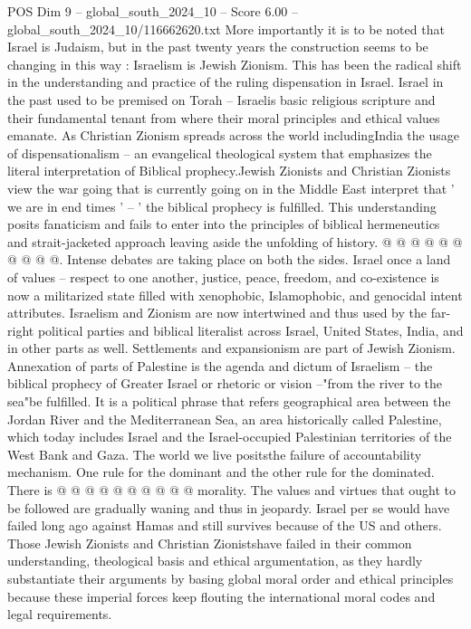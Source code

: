\begin{textsample}{POS Dim 9 – global\_south\_2024\_10 – Score 6.00 – global\_south\_2024\_10/116662620.txt}
More importantly it is to be noted that Israel is Judaism, but in the past twenty years the construction seems to be changing in this way : Israelism is Jewish Zionism.
This has been the radical shift in the understanding and practice of the ruling dispensation in Israel.
Israel in the past used to be premised on Torah -- Israelis basic religious scripture and their fundamental tenant from where their moral principles and ethical values emanate.
As Christian Zionism spreads across the world includingIndia the usage of dispensationalism -- an evangelical theological system that emphasizes the literal interpretation of Biblical prophecy.Jewish Zionists and Christian Zionists view the war going that is currently going on in the Middle East interpret that ' we are in end times ' -- ' the biblical prophecy is fulfilled.
This understanding posits fanaticism and fails to enter into the principles of biblical hermeneutics and strait-jacketed approach leaving aside the unfolding of history. @ @ @ @ @ @ @ @ @ @.
Intense debates are taking place on both the sides.
Israel once a land of values -- respect to one another, justice, peace, freedom, and co-existence is now a militarized state filled with xenophobic, Islamophobic, and genocidal intent attributes.
Israelism and Zionism are now intertwined and thus used by the far-right political parties and biblical literalist across Israel, United States, India, and in other parts as well.
Settlements and expansionism are part of Jewish Zionism.
Annexation of parts of Palestine is the agenda and dictum of Israelism -- the biblical prophecy of Greater Israel or rhetoric or vision --"from the river to the sea"be fulfilled.
It is a political phrase that refers geographical area between the Jordan River and the Mediterranean Sea, an area historically called Palestine, which today includes Israel and the Israel-occupied Palestinian territories of the West Bank and Gaza.
The world we live positsthe failure of accountability mechanism.
One rule for the dominant and the other rule for the dominated.
There is @ @ @ @ @ @ @ @ @ @ morality.
The values and virtues that ought to be followed are gradually waning and thus in jeopardy.
Israel per se would have failed long ago against Hamas and still survives because of the US and others.
Those Jewish Zionists and Christian Zionistshave failed in their common understanding, theological basis and ethical argumentation, as they hardly substantiate their arguments by basing global moral order and ethical principles because these imperial forces keep flouting the international moral codes and legal requirements.

\end{textsample}
